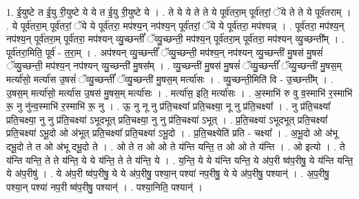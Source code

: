 \documentclass[17pt]{extarticle}
\begin{document}
1. ई॒युष्टे त ई॒यु री॒युष्टे ये ये त ई॒यु री॒युष्टे ये । . ते ये ये ते ते ये पूर्व॑तरा॒म् पूर्व॑तरां॒ ॅये ते ते ये पूर्व॑तराम् । . ये पूर्व॑तरा॒म् पूर्व॑तरां॒ ॅये ये पूर्व॑तरा॒ मप॑श्य॒न् नप॑श्य॒न् पूर्व॑तरां॒ ॅये ये पूर्व॑तरा॒ मप॑श्यन्न् । . पूर्व॑तरा॒ मप॑श्य॒न् नप॑श्य॒न् पूर्व॑तरा॒म् पूर्व॑तरा॒ मप॑श्यन् व्यु॒च्छन्तीं᳚ ॅव्यु॒च्छन्ती॒ मप॑श्य॒न् पूर्व॑तरा॒म् पूर्व॑तरा॒ मप॑श्यन् व्यु॒च्छन्ती᳚म् । . पूर्व॑तरा॒मिति॒ पूर्व॑ - त॒रा॒म् । . अप॑श्यन् व्यु॒च्छन्तीं᳚ ॅव्यु॒च्छन्ती॒ मप॑श्य॒न् नप॑श्यन् व्यु॒च्छन्ती॑ मु॒षस॑ मु॒षसं॑ ॅव्यु॒च्छन्ती॒ मप॑श्य॒न् नप॑श्यन् व्यु॒च्छन्ती॑ मु॒षस᳚म् । . व्यु॒च्छन्ती॑ मु॒षस॑ मु॒षसं॑ ॅव्यु॒च्छन्तीं᳚ ॅव्यु॒च्छन्ती॑ मु॒षस॒म् मर्त्या॑सो॒ मर्त्या॑स उ॒षसं॑ ॅव्यु॒च्छन्तीं᳚ ॅव्यु॒च्छन्ती॑ मु॒षस॒म् मर्त्या॑सः । . व्यु॒च्छन्ती॒मिति॑ वि - उ॒च्छन्ती᳚म् । . उ॒षस॒म् मर्त्या॑सो॒ मर्त्या॑स उ॒षस॑ मु॒षस॒म् मर्त्या॑सः । . मर्त्या॑स॒ इति॒ मर्त्या॑सः । . अ॒स्माभि॑ रु वु व॒स्माभि॑ र॒स्माभि॑ रू॒ नु नु॑न्व॒स्माभि॑ र॒स्माभि॑ रू॒ नु । . ऊ॒ नु नू नु प्र॑ति॒चक्ष्या᳚ प्रति॒चक्ष्या॒ नू नु प्र॑ति॒चक्ष्या᳚ । . नु प्र॑ति॒चक्ष्या᳚ प्रति॒चक्ष्या॒ नु नु प्र॑ति॒चक्ष्या॑ ऽभूदभूत् प्रति॒चक्ष्या॒ नु नु प्र॑ति॒चक्ष्या॑ ऽभूत् । . प्र॒ति॒चक्ष्या॑ ऽभूदभूत् प्रति॒चक्ष्या᳚ प्रति॒चक्ष्या॑ ऽभू॒दो ओ अ॑भूत् प्रति॒चक्ष्या᳚ प्रति॒चक्ष्या॑ ऽभू॒दो । . प्र॒ति॒चक्ष्येति॑ प्रति - चक्ष्या᳚ । . अ॒भू॒दो ओ अ॑भू दभू॒दो ते त ओ अ॑भू दभू॒दो ते । . ओ ते त ओ ओ ते य॑न्ति यन्ति॒ त ओ ओ ते य॑न्ति । . ओ इत्यो । . ते य॑न्ति यन्ति॒ ते ते य॑न्ति॒ ये ये य॑न्ति॒ ते ते य॑न्ति॒ ये । . य॒न्ति॒ ये ये य॑न्ति यन्ति॒ ये अ॑प॒री ष्व॑प॒रीषु॒ ये य॑न्ति यन्ति॒ ये अ॑प॒रीषु॑ । . ये अ॑प॒री ष्व॑प॒रीषु॒ ये ये अ॑प॒रीषु॒ पश्या॒न् पश्या॑ नप॒रीषु॒ ये ये अ॑प॒रीषु॒ पश्यान्॑ । . अ॒प॒रीषु॒ पश्या॒न् पश्या॑ नप॒री ष्व॑प॒रीषु॒ पश्यान्॑ । . पश्या॒निति॒ पश्यान्॑ । \newline
\pagebreak
{}
\end{document}
